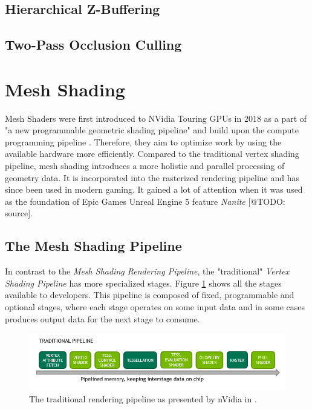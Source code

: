 \subsection{Hierarchical Z-Buffering} \label{subsec-hierarchical-z-buffering}

\subsection{Two-Pass Occlusion Culling} \label{subsec-two-pass-occlusion-culling}

\section{Mesh Shading}

Mesh Shaders were first introduced to NVidia Touring \ac{GPU}s in 2018 as a part of
"a new programmable geometric shading pipeline" and build upon the compute programming 
pipeline \cite[Christoph Kubisch]{Kubisch2018}. Therefore, they aim to optimize work by 
using the available hardware more efficiently. Compared to the traditional vertex shading 
pipeline, mesh shading introduces a more holistic and parallel processing of geometry data.
It is incorporated into the rasterized rendering pipeline and has since been used in modern 
gaming. It gained a lot of attention when it was used as the foundation of Epic Games 
Unreal Engine 5 feature \emph{Nanite} [@TODO: source].\\

\subsection{The Mesh Shading Pipeline} \label{subsec-the-mesh-shading-pipeline}

In contrast to the \emph{Mesh Shading Rendering Pipeline}, the "traditional" \emph{Vertex Shading Pipeline} 
has more specialized stages. Figure \ref{fig:traditional-rendering-pipeline} shows all the stages available 
to developers. This pipeline is composed of fixed, programmable and optional stages, where each 
stage operates on some input data and in some cases produces output data for the next stage to consume.\\

\begin{figure}[h]
    \centering
    \includegraphics[width=\linewidth]{images/graphics/traditional-rendering-pipeline.png}
    \caption{The traditional rendering pipeline as presented by nVidia in \cite{Kubisch2018}.}
    \label{fig:traditional-rendering-pipeline}
\end{figure}

